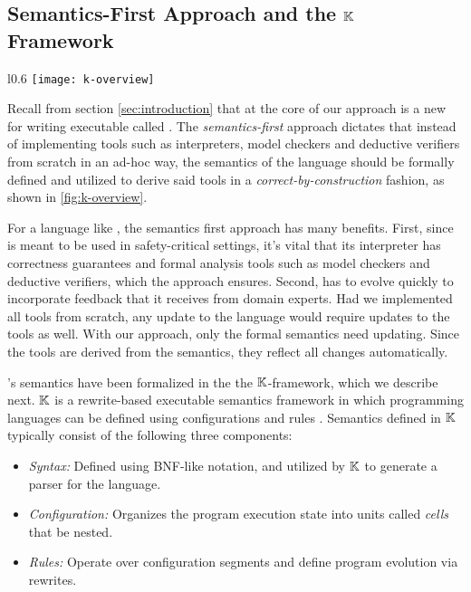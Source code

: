 \subsection{Semantics-First Approach and the $\mathbb{K}$ Framework}\label{subsec:semantics-first-and-k}
\begin{wrapfigure}{l}{0.6\textwidth}
  \centering
  \texttt{[image: k-overview]}
  \caption{\emph{Semantics-first} Approach} \label{fig:k-overview}
\end{wrapfigure}
Recall from section \ref{sec:introduction} that at the core of our approach
is a new \DSL{} for writing executable \BPGs{} called \MediK{}.
The \emph{semantics-first} approach dictates that instead of
implementing tools such as interpreters, model checkers and deductive verifiers
from scratch in an ad-hoc way, the semantics of the language should
be formally defined and utilized to derive said tools in a
\emph{correct-by-construction} fashion, as shown in \figurename{} \ref{fig:k-overview}.

For a language like \MediK{}, the semantics first approach has many benefits. First,
since \MediK{} is meant to be used in safety-critical settings,
it's vital that its interpreter has correctness guarantees and formal analysis
tools such as model checkers and deductive verifiers, which the approach ensures.
Second, \MediK{} has to evolve quickly to incorporate feedback that it receives from domain experts.
Had we implemented all tools from scratch, any update to the language would
require updates to the tools as well. With our approach, only the formal semantics
need updating. Since the tools are derived from the semantics, they reflect all
changes automatically.

\MediK{}'s semantics have been formalized in the the $\mathbb{K}{}$-framework, which
we describe next. $\mathbb{K}$ is a rewrite-based executable semantics framework in which
programming languages can be defined
using configurations and rules \cite{KFrameworkURL}. Semantics
defined in $\mathbb{K}$ typically consist of the following three components:
\begin{itemize}
  \item \emph{Syntax:} Defined using BNF-like notation, and utilized
    by $\mathbb{K}{}$ to generate a parser for the language.
  \item \emph{Configuration:} Organizes the program execution state into
    units called \emph{cells} that be nested.
  \item \emph{Rules:} Operate over configuration segments and define
    program evolution via rewrites.
\end{itemize}

